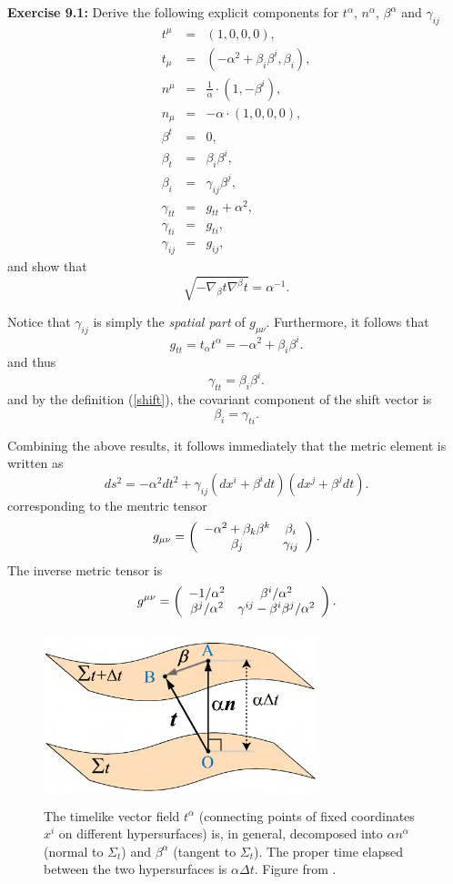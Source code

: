 \documentclass[12pt]{article}
\def\a{\alpha}
\def\b{\beta}
\def\be{\begin{equation}}
\def\ee{\end{equation}}
\newcommand{\na}{\nabla}
\def\a{\alpha}
\def\b{\beta}
\def\bea{\begin{eqnarray}}
\def\eea{\end{eqnarray}}
\begin{document}
{\vskip0.5cm
{\bf Exercise 9.1:} Derive the following explicit components for $t^\alpha$, $n^\alpha$, $\beta^\alpha$ and $\gamma_{ij}$ 
\bea 
t^\mu &=& (1,0,0,0),\\
t_{\mu} &=& (-\alpha^2+\b_i \b^i, \b_i), \\
n^\mu &=& \frac{1}{\alpha} \cdot ( 1 ,  - \beta ^ { i }  ), \\
n_\mu &=& -\alpha \cdot(1,0,0,0), \label{nmu} \\
\beta^t & = & 0, \\
\beta_t & = & \b_i \b^i, \\
\beta_i &=& \gamma_{ij}\beta^j,\\
\gamma_{tt} & = & g_{tt}+\alpha^2, \\
\gamma_{ti} & = & g_{ti}, \\
\gamma_{ij}  &=&  g_{ij},
\eea
and show that 
\be
\sqrt{-\na_\b t\na^\b t} = \alpha^{-1}.
\ee

\vskip0.5cm
Notice that $\gamma_{ij}$ is simply the {\it spatial part} of $g_{\mu\nu}$. Furthermore, it follows that
\be
 g_{tt} = t_\a t^\a=-\a^2+\b_i \b^i.
 \ee
 and thus
 \be
 \gamma_{tt} =\b_i \b^i.
 \ee
 and by the definition (\ref{shift}), the covariant component of the shift vector is 
 \be
 \beta_i = \gamma_{ti}.
 \ee
 
Combining the above results, it follows immediately that the metric element is written as
\be
\boxed{ ds^2 = -\alpha^2 dt^2 +\gamma_{ij}(dx^i+\beta^i dt)(dx^j+\beta^j dt)
}.
\label{gmunu}
\ee
corresponding to the mentric tensor 
\be
g _ { \mu \nu } = \left( \begin{array} { c c } { - \alpha ^ { 2 } + \beta _ { k } \beta ^ { k } } & { \beta _ { i } } \\ { \beta _ { j } } & { \gamma _ { i j } } \end{array} \right).
\ee
The inverse metric tensor is
\be
g ^ { \mu \nu } = \left( \begin{array} { c c } { - 1 / \alpha ^ { 2 } } & { \beta ^ { i } / \alpha ^ { 2 } } \\ { \beta ^ { j } / \alpha ^ { 2 } } & { \gamma ^ { i j } - \beta ^ { i } \beta ^ { j } / \alpha ^ { 2 } } \end{array} \right).
\ee

\begin{figure}
  \centering
  \includegraphics[width=8cm,height=5cm]{./figs/Lapse-Shift.png}
  \caption{The timelike vector field $t^\alpha$ (connecting points of fixed coordinates $x^i$ on different hypersurfaces) is, in general, decomposed into  $\alpha n^\alpha$ (normal to $\Sigma_t$) and $\beta^\alpha$ (tangent to  $\Sigma_t$). The proper time elapsed between the two hypersurfaces is $\alpha \Delta t$.  Figure from \cite{Shibata1996}.}
\end{figure}


}
\end{document}
